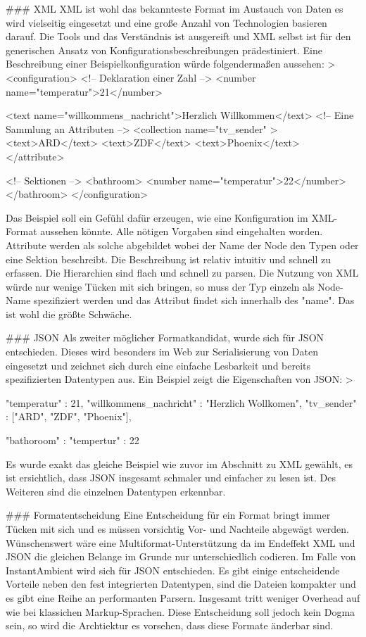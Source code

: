 ### XML
XML ist wohl das bekannteste Format im Austauch von Daten es wird vielseitig eingesetzt und eine große Anzahl von Technologien basieren darauf. Die Tools und das Verständnis ist ausgereift und XML selbst ist für den generischen Ansatz von Konfigurationsbeschreibungen prädestiniert. Eine Beschreibung einer Beispielkonfiguration würde folgendermaßen aussehen: 
> <configuration>
	<!-- Deklaration einer Zahl -->
	<number name="temperatur">21</number>
	
	<text name="willkommens_nachricht">Herzlich Willkommen</text>
	<!-- Eine Sammlung an Attributen -->
	<collection name="tv_sender" >
		<text>ARD</text>
		<text>ZDF</text>
		<text>Phoenix</text>
	</attribute>

	<!-- Sektionen -->
	<bathroom>
		<number name="temperatur">22</number>
	</bathroom>
</configuration>

Das Beispiel soll ein Gefühl dafür erzeugen, wie eine Konfiguration im XML-Format aussehen könnte. Alle nötigen Vorgaben sind eingehalten worden. Attribute werden als solche abgebildet wobei der Name der Node den Typen oder eine Sektion beschreibt. Die Beschreibung ist relativ intuitiv und schnell zu erfassen. Die Hierarchien sind flach und schnell zu parsen. Die Nutzung von XML würde nur wenige Tücken mit sich bringen, so muss der Typ einzeln als Node-Name spezifiziert werden und das Attribut findet sich innerhalb des "name". Das ist wohl die größte Schwäche. 

### JSON 
Als zweiter möglicher Formatkandidat, wurde sich für JSON entschieden. Dieses wird besonders im Web zur Serialisierung von Daten eingesetzt und zeichnet sich durch eine einfache Lesbarkeit und bereits spezifizierten Datentypen aus. Ein Beispiel zeigt die Eigenschaften von JSON:
>{
	"temperatur" : 21,
	"willkommens_nachricht" : "Herzlich Wollkomen", 
	"tv_sender" : ["ARD", "ZDF", "Phoenix"], 

	"bathoroom" : {
		"tempertur" : 22
	}
}

Es wurde exakt das gleiche Beispiel wie zuvor im Abschnitt zu XML gewählt, es ist ersichtlich, dass JSON insgesamt schmaler und einfacher zu lesen ist. Des Weiteren sind die einzelnen Datentypen erkennbar.

### Formatentscheidung
Eine Entscheidung für ein Format bringt immer Tücken mit sich und es müssen vorsichtig Vor- und Nachteile abgewägt werden. Wünschenswert wäre eine Multiformat-Unterstützung da im Endeffekt XML und JSON die gleichen Belange im Grunde nur unterschiedlich codieren. Im Falle von InstantAmbient wird sich für JSON entschieden. Es gibt einige entscheidende Vorteile neben den fest integrierten Datentypen, sind die Dateien kompakter und es gibt eine Reihe an performanten Parsern. Insgesamt tritt weniger Overhead auf wie bei klassichen Markup-Sprachen. Diese Entscheidung soll jedoch kein Dogma sein, so wird die Archtiektur es vorsehen, dass diese Formate änderbar sind. 

